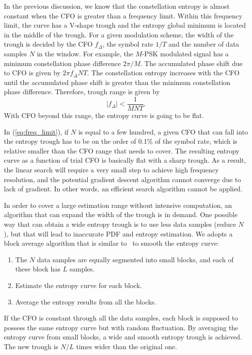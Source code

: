 \documentclass[journal,comsoc]{IEEEtran}
\begin{document}
In the previous discussion, we know that the constellation entropy is almost constant when the CFO is greater than a frequency limit.
Within this frequency limit, the curve has a V-shape trough and the entropy global minimum is located in the middle of the trough.
For a given modulation scheme, the width of the trough is decided by the CFO $f_\Delta$, the symbol rate $1/T$ and the number of data samples $N$ in the window.
For example, the \(M\)-PSK modulated signal has a minimum constellation phase difference \(2\pi/M\).
The accumulated phase shift due to CFO is given by \(2\pi f_\Delta N T\).
The constellation entropy increases with the CFO until the accumulated phase shift is greater than the minimum constellation phase difference. 
Therefore, trough range is given by
\begin{equation}
\left| {f_\Delta } \right| < \frac{1}{{MNT}}.
\label{eq:freq_limit}
\end{equation}
With CFO beyond this range, the entropy curve is going to be flat.


In (\ref{eq:freq_limit}), if \(N\) is equal to a few hundred, a given CFO that can fall into the entropy trough has to be on the order of 0.1\% of the symbol rate, which is relative smaller than the CFO range that needs to cover.
The resulting entropy curve as a function of trial CFO is basically flat with a sharp trough.
As a result, the linear search will require a very small step to achieve high frequency resolution, and the potential gradient descent algorithm cannot converge due to lack of gradient.
In other words, an efficient search algorithm cannot be applied. 

In order to cover a large estimation range without intensive computation, an algorithm that can expand the width of the trough is in demand.
One possible way that can obtain a wide entropy trough is to use less data samples (reduce \(N\)), but that will lead to inaccurate PDF and entropy estimation.
We adopts a block average algorithm that is similar to~\cite{YuanlingHuang2007} to smooth the entropy curve:
\begin{enumerate}
\item The \(N\) data samples are equally segmented into small blocks, and each of these block has \(L\) samples. 
\item Estimate the entropy curve for each block.
\item Average the entropy results from all the blocks.
\end{enumerate}
If the CFO is constant through all the data samples, each block is supposed to possess the same entropy curve but with random fluctuation.
By averaging the entropy curve from small blocks, a wide and smooth entropy trough is achieved.
The new trough is $N/L$ times wider than the original one.
\end{document}
